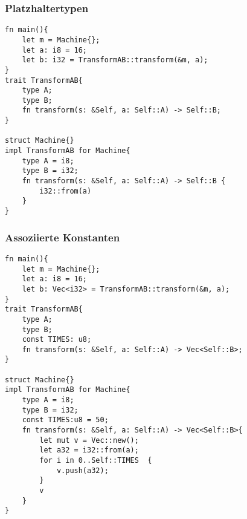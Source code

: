 \documentclass[a4paper, 1ppt]{article}
\begin{document}
\subsubsection{Platzhaltertypen}
\begin{verbatim}
fn main(){
    let m = Machine{};
    let a: i8 = 16;
    let b: i32 = TransformAB::transform(&m, a);
}
trait TransformAB{
    type A;
    type B;
    fn transform(s: &Self, a: Self::A) -> Self::B;
}

struct Machine{}
impl TransformAB for Machine{
    type A = i8;
    type B = i32;
    fn transform(s: &Self, a: Self::A) -> Self::B {
        i32::from(a)
    }
}
\end{verbatim}
\subsubsection{Assoziierte Konstanten}
\begin{verbatim}
fn main(){
    let m = Machine{};
    let a: i8 = 16;
    let b: Vec<i32> = TransformAB::transform(&m, a);
}
trait TransformAB{
    type A;
    type B;
    const TIMES: u8;
    fn transform(s: &Self, a: Self::A) -> Vec<Self::B>;
}

struct Machine{}
impl TransformAB for Machine{
    type A = i8;
    type B = i32;
    const TIMES:u8 = 50;
    fn transform(s: &Self, a: Self::A) -> Vec<Self::B>{
        let mut v = Vec::new();
        let a32 = i32::from(a);
        for i in 0..Self::TIMES  {
            v.push(a32);
        }
        v
    }
}
\end{verbatim}
\end{document}
